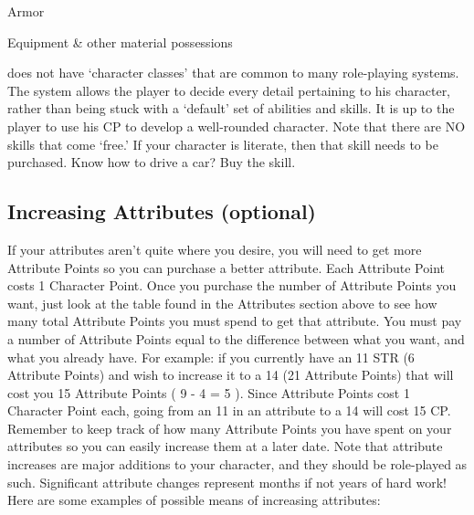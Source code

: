 \documentclass[twoside]{book}
\begin{document}
                       Armor 
                      
                    
                    
                       Equipment 
                        \& other material possessions 
                    
                  
                  
                
            \APATHY{}  does not have `character
              classes' that are common to many role-playing
              systems. The \APATHY{}  system allows the player to decide
              every detail pertaining to his character, rather than being
              stuck with a `default' set of abilities and
              skills. It is up to the player to use his CP to develop a
              well-rounded character. Note that there are NO skills that
              come `free.' If your character is literate,
              then that skill needs to be purchased. Know how to drive a
              car? Buy the skill.
            
\subsection{Increasing Attributes (optional)}
     If your attributes aren't quite where you
               desire, you will need to get more Attribute Points so you
               can purchase a better attribute. Each Attribute Point
               costs 1 Character Point. Once you purchase the number of
               Attribute Points you want, just look at the table found in
               the Attributes section above to see how many total
               Attribute Points you must spend to get that attribute.
                You must pay a number of Attribute Points equal to
              the difference between what you want, and what you already
              have. For example: if you currently have an 11 STR (6
              Attribute Points) and wish to increase it to a 14 (21
              Attribute Points) that will cost you 15 Attribute Points (
               9  -  4  =
               5  ). Since Attribute Points cost
              1 Character Point each, going from an 11 in an attribute to
              a 14 will cost 15 CP.
             Remember to keep track of how many Attribute Points
               you have spent on your attributes so you can easily
               increase them at a later date.  Note that attribute increases are major additions to
               your character, and they should be role-played as such.
               Significant attribute changes represent months if not
               years of hard work! Here are some examples of possible
               means of increasing attributes:   
                
\end{document}
